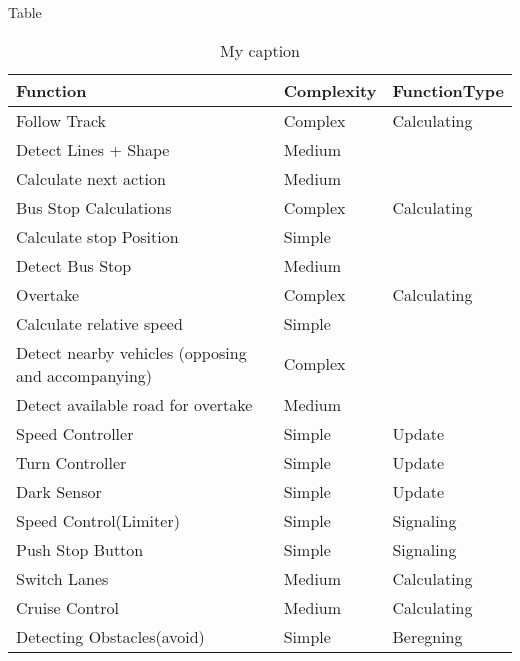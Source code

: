 Table
\begin{table}[H]
\centering
\begin{tabular}{|l|l|l|}
\hline
\rowcolor[HTML]{FFFFFF} 
Function                                           & Complexity & FunctionType \\ \hline
\rowcolor[HTML]{9B9B9B} 
Follow Track                                       & Complex    & Calculating  \\ \hline
\rowcolor[HTML]{C0C0C0} 
Detect Lines + Shape                               & Medium     &              \\ \hline
\rowcolor[HTML]{C0C0C0} 
Calculate next action                              & Medium     &              \\ \hline
\rowcolor[HTML]{9B9B9B} 
Bus Stop Calculations                              & Complex    & Calculating  \\ \hline
\rowcolor[HTML]{C0C0C0} 
Calculate stop Position                            & Simple     &              \\ \hline
\rowcolor[HTML]{C0C0C0} 
Detect Bus Stop                                    & Medium     &              \\ \hline
\rowcolor[HTML]{9B9B9B} 
Overtake                                           & Complex    & Calculating  \\ \hline
\rowcolor[HTML]{C0C0C0} 
Calculate relative speed                           & Simple     &              \\ \hline
\rowcolor[HTML]{C0C0C0} 
Detect nearby vehicles (opposing and accompanying) & Complex    &              \\ \hline
\rowcolor[HTML]{C0C0C0} 
Detect available road for overtake                 & Medium     &              \\ \hline
Speed Controller                                   & Simple     & Update       \\ \hline
Turn Controller                                    & Simple     & Update       \\ \hline
Dark Sensor                                        & Simple     & Update       \\ \hline
Speed Control(Limiter)                             & Simple     & Signaling    \\ \hline
Push Stop Button                                   & Simple     & Signaling    \\ \hline
Switch Lanes                                       & Medium     & Calculating  \\ \hline
Cruise Control                                     & Medium     & Calculating  \\ \hline
Detecting Obstacles(avoid)                         & Simple     & Beregning    \\ \hline
\end{tabular}
\caption{My caption}
\label{my-label}
\end{table}